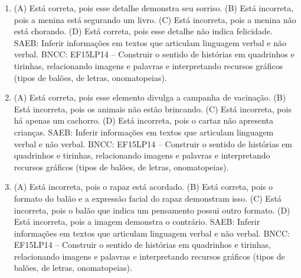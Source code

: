 
\begin{enumerate}
\item
(A) Está correta, pois esse detalhe demonstra seu sorriso.
(B) Está incorreta, pois a menina está segurando um livro.
(C) Está incorreta, pois a menina não está chorando.
(D) Está correta, pois esse detalhe não indica felicidade.
SAEB: Inferir informações em textos que articulam linguagem verbal e não verbal.
BNCC: EF15LP14 -- Construir o sentido de histórias em quadrinhos
e tirinhas, relacionando imagens e palavras e interpretando recursos
gráficos (tipos de balões, de letras, onomatopeias).

\item
(A) Está correta, pois esse elemento divulga a campanha de vacinação.
(B) Está incorreta, pois os animais não estão brincando.
(C) Está incorreta, pois há apenas um cachorro.
(D) Está incorreta, pois o cartaz não apresenta crianças.
SAEB: Inferir informações em textos que articulam linguagem verbal e não verbal.
BNCC: EF15LP14 -- Construir o sentido de histórias em quadrinhos
e tirinhas, relacionando imagens e palavras e interpretando recursos
gráficos (tipos de balões, de letras, onomatopeias).

\item
(A) Está incorreta, pois o rapaz está acordado.
(B) Está correta, pois o formato do balão e a expressão facial do rapaz
demonstram isso.
(C) Está incorreta, pois o balão que indica um pensamento possui outro formato.
(D) Está incorreta, pois a imagem demonstra o contrário.
SAEB: Inferir informações em textos que articulam linguagem
verbal e não verbal.
BNCC: EF15LP14 -- Construir o sentido de histórias em quadrinhos
e tirinhas, relacionando imagens e palavras e interpretando recursos
gráficos (tipos de balões, de letras, onomatopeias).
\end{enumerate}


